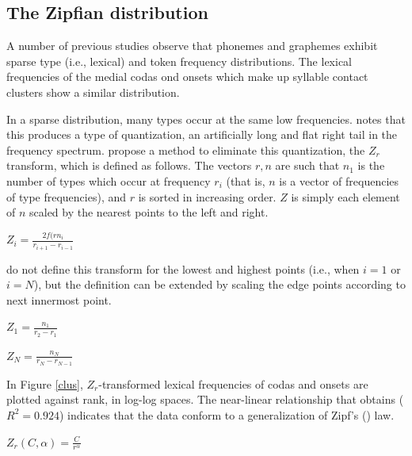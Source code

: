 \subsection{The Zipfian distribution}

A number of previous studies \citep[e.g.,][]{Weiss1961,Sigurd1968,Good1969,Borodovsky1989,Witten1990,Martindale1996,Tambovtsev2007} observe that phonemes and graphemes exhibit sparse type (i.e., lexical) and token frequency distributions. The lexical frequencies of the medial codas ond onsets which make up syllable contact clusters show a similar distribution. 

In a sparse distribution, many types occur at the same low frequencies. \citet{Good1953} notes that this produces a type of quantization, an artificially long and flat right tail in the frequency spectrum. \citet[][29]{Church1991} propose a method to eliminate this quantization, the $Z_r$ transform, which is defined as follows. The vectors $r, n$ are such that $n_1$ is the number of types which occur at frequency $r_i$ (that is, $n$ is a vector of frequencies of type frequencies), and $r$ is sorted in increasing order. $Z$ is simply each element of $n$ scaled by the nearest points to the left and right. 

\begin{unlabeledexample}
$\displaystyle Z_i = \frac{2 f(rn_i}{r_{i + 1} - r_{i - 1}}$
\end{unlabeledexample}

\noindent \citeauthor{Church1991} do not define this transform for the lowest and highest points (i.e., when $i = 1$ or $i = N$), but the definition can be extended by scaling the edge points according to next innermost point.

\begin{unlabeledexample}
$\displaystyle Z_1 = \frac{n_1}{r_2 - r_1}$
\end{unlabeledexample}

\begin{unlabeledexample}
$\displaystyle Z_N = \frac{n_N}{r_N - r_{N - 1}}$
\end{unlabeledexample}

In Figure \ref{clus}, $Z_r$-transformed lexical frequencies of codas and onsets are plotted against rank, in log-log spaces. The near-linear relationship that obtains ($R^2 = 0.924$) indicates that the data conform to a generalization of Zipf's (\citeyear{Zipf1949}) law.

\begin{unlabeledexample}
$\displaystyle Z_r(C, \alpha) = \frac{C}{r^\alpha}$
\end{unlabeledexample}

